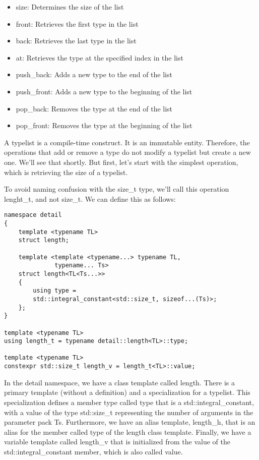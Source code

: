 \begin{itemize}
\item
size: Determines the size of the list

\item
front: Retrieves the first type in the list

\item
back: Retrieves the last type in the list

\item
at: Retrieves the type at the specified index in the list

\item
push\_back: Adds a new type to the end of the list

\item
push\_front: Adds a new type to the beginning of the list

\item
pop\_back: Removes the type at the end of the list

\item
pop\_front: Removes the type at the beginning of the list
\end{itemize}

A typelist is a compile-time construct. It is an immutable entity. Therefore, the operations that add or remove a type do not modify a typelist but create a new one. We’ll see that shortly. But first, let’s start with the simplest operation, which is retrieving the size of a typelist.

To avoid naming confusion with the size\_t type, we’ll call this operation lenght\_t, and not size\_t. We can define this as follows:

\begin{lstlisting}[style=styleCXX]
namespace detail
{
	template <typename TL>
	struct length;
	
	template <template <typename...> typename TL,
			  typename... Ts>
	struct length<TL<Ts...>>
	{
		using type =
		std::integral_constant<std::size_t, sizeof...(Ts)>;
	};
}

template <typename TL>
using length_t = typename detail::length<TL>::type;

template <typename TL>
constexpr std::size_t length_v = length_t<TL>::value;
\end{lstlisting}

In the detail namespace, we have a class template called length. There is a primary template (without a definition) and a specialization for a typelist. This specialization defines a member type called type that is a std::integral\_constant, with a value of the type std::size\_t representing the number of arguments in the parameter pack Ts. Furthermore, we have an alias template, length\_h, that is an alias for the member called type of the length class template. Finally, we have a variable template called length\_v that is initialized from the value of the std::integral\_constant member, which is also called value.

